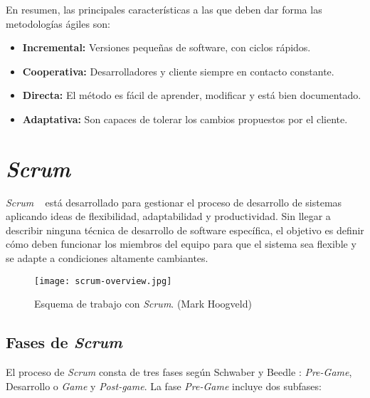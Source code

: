 En resumen, las principales características a las que deben dar forma las metodologías ágiles son:
\begin{itemize}
\item \textbf{Incremental:} Versiones pequeñas de software, con ciclos rápidos. 
\item \textbf{Cooperativa:} Desarrolladores y cliente siempre en contacto constante.
\item \textbf{Directa:} El método es fácil de aprender, modificar y está bien documentado.
\item \textbf{Adaptativa:} Son capaces de tolerar los cambios propuestos por el cliente.
\end{itemize}
\section{\textit{Scrum}}
\textit{Scrum} ~\cite{Ubeda} está desarrollado para gestionar el proceso de desarrollo de sistemas aplicando ideas de flexibilidad, adaptabilidad y productividad. Sin llegar a describir ninguna técnica de desarrollo de software específica, el objetivo es definir cómo deben funcionar los miembros del equipo para que el sistema sea flexible y se adapte a condiciones altamente cambiantes.
 
\begin{figure}[t] 
  \centering
  \texttt{[image: scrum-overview.jpg]}
  \caption{Esquema de trabajo con \textit{Scrum}. (Mark Hoogveld)}
  \label{fig:scrum}
\end{figure}

\subsection{Fases de \textit{Scrum}}
El proceso de \textit{Scrum} consta de tres fases según Schwaber y Beedle \cite{Schwaber}: \textit{Pre-Game}, Desarrollo o \textit{Game} y \textit{Post-game}. La fase \textit{Pre-Game} incluye dos subfases:

